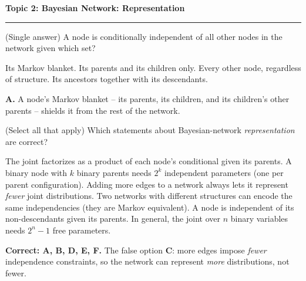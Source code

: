 \documentclass[answers,addpoints]{exam}
\newcommand{\topic}[2]{%
  \vspace{1.0\baselineskip}%
  \noindent\textbf{\large Topic #1: #2}\par
  \noindent\rule{\linewidth}{0.4pt}\par
  \vspace{0.4\baselineskip}}
\begin{document}
\begin{questions}

\topic{2}{Bayesian Network: Representation}

\question[2] (Single answer) A node is conditionally independent of all other
nodes in the network given which set?
\begin{choices}
  \CorrectChoice Its Markov blanket.
  \choice Its parents and its children only.
  \choice Every other node, regardless of structure.
  \choice Its ancestors together with its descendants.
\end{choices}
\begin{solution}\textbf{A.} A node's Markov blanket -- its parents, its children,
and its children's other parents -- shields it from the rest of the network.\end{solution}

\question[3] (Select all that apply) Which statements about Bayesian-network
\emph{representation} are correct?
\begin{checkboxes}
  \CorrectChoice The joint factorizes as a product of each node's conditional
        given its parents.
  \CorrectChoice A binary node with $k$ binary parents needs $2^{k}$ independent
        parameters (one per parent configuration).
  \choice Adding more edges to a network always lets it represent \emph{fewer}
        joint distributions.
  \CorrectChoice Two networks with different structures can encode the same
        independencies (they are Markov equivalent).
  \CorrectChoice A node is independent of its non-descendants given its parents.
  \CorrectChoice In general, the joint over $n$ binary variables needs $2^{n}-1$
        free parameters.
\end{checkboxes}
\begin{solution}
\textbf{Correct: A, B, D, E, F.} The false option \textbf{C}: more edges impose
\emph{fewer} independence constraints, so the network can represent \emph{more}
distributions, not fewer.
\end{solution}


\end{questions}
\end{document}
